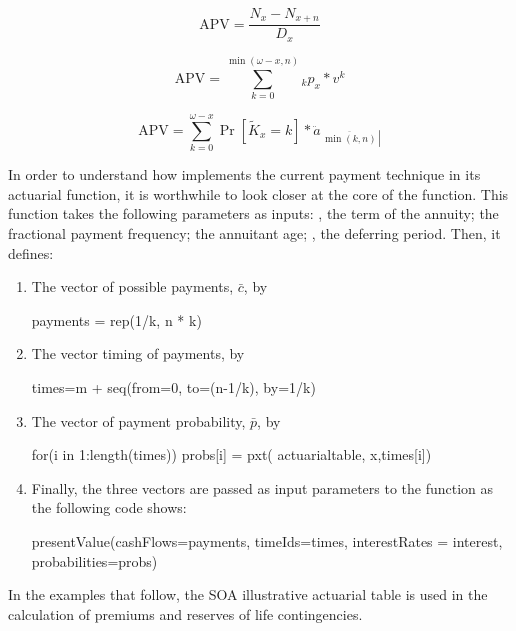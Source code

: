\documentclass[nojss]{jss}
\begin{document}
\begin{equation}
	\text{APV} = \frac{N_x - N_{x + n}}{D_x}
	\label{eq:anndueComm}
\end{equation}   

\begin{equation}
\text{APV} = \sum\limits_{k = 0}^{\min \left( \omega  - x ,n \right)} {{}_{k}p_{x}*v^{k}} 
	\label{eq:anndueCVA}
\end{equation}

\begin{equation}
\text{APV} = \sum\limits_{k = 0}^{\omega  - x} {\Pr \left[ \tilde K_x = k \right]*{\ddot a_{\left. {\overline {\, 
 {\min \left( k, n \right)} \,}}\! \right| }}} 
 \label{eq:anndueEVT}
\end{equation}

In order to understand how  implements the current
payment technique in its actuarial function, it is worthwhile to look closer at the core of the
 function. This function takes the following parameters as
inputs: , the term of the annuity;  the fractional payment frequency; 
 the annuitant age; , the deferring period. Then, it defines:
\begin{enumerate}
  \item The vector of possible payments, $\bar{c}$, by
    \begin{Code}
     payments = rep(1/k, n * k)
    \end{Code}
  \item The vector timing of payments, by
     \begin{Code}
     times=m + seq(from=0, to=(n-1/k), by=1/k)
     \end{Code}
   \item The vector of payment probability, $\bar{p}$, by
     \begin{Code}
     for(i in 1:length(times)) probs[i] = pxt(
     actuarialtable, x,times[i])
     \end{Code}
   \item Finally, the three vectors are passed as input parameters to the
    function as the following code shows:
   \begin{Code}
     presentValue(cashFlows=payments, timeIds=times, 
     interestRates = interest,
     probabilities=probs)
   \end{Code}
\end{enumerate}


In the examples that follow, the SOA illustrative actuarial 
table is used in the calculation of premiums and reserves of life contingencies.\\
\end{document}
